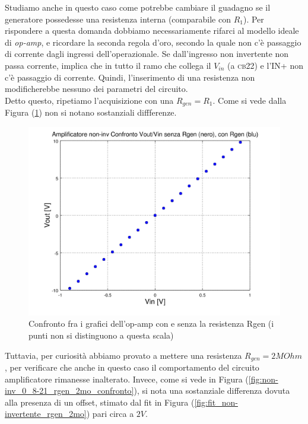 \documentclass[journal, a4paper]{IEEEtran}
\begin{document}
Studiamo anche in questo caso come potrebbe cambiare il guadagno se il generatore possedesse una resistenza interna (comparabile con $R_1$). Per rispondere a questa domanda dobbiamo necessariamente rifarci al modello ideale di \textit{op-amp}, e ricordare la seconda regola d'oro, secondo la quale non c'è passaggio di corrente dagli ingressi dell'operazionale. Se dall'ingresso non invertente non passa corrente, implica che in tutto il ramo che collega il $V_{in}$ (a \textsc{cb22}) e l'\textsc{IN+} non c'è passaggio di corrente. Quindi, l'inserimento di una resistenza non modificherebbe nessuno dei parametri del circuito.\\

Detto questo, ripetiamo l'acquisizione con una $R_{gen} = R_1 $. Come si vede dalla Figura (\ref{fig:non-inv-confronto-senza_con_rgen-0_9_21}) non si notano sostanziali diffferenze.\\

\begin{figure}
\centering
\includegraphics[width=0.9\linewidth]{./non-inv-confronto-senza_con_rgen-0_9_21}
\caption{Confronto fra i grafici dell'op-amp con e senza la resistenza Rgen (i punti non si distinguono a questa scala)}
\label{fig:non-inv-confronto-senza_con_rgen-0_9_21}
\end{figure}


Tuttavia, per curiosità abbiamo provato a mettere una resistenza $R_{gen} = 2M\si{Ohm} $, per verificare che anche in questo caso il comportamento del circuito amplificatore rimanesse inalterato. Invece, come si vede in Figura (\ref{fig:non-inv_0_8-21_rgen_2mo_confronto}), si nota una sostanziale differenza dovuta alla presenza di un offset, stimato dal fit in Figura (\ref{fig:fit_non-invertente_rgen_2mo}) pari circa a $2V$.\\
\end{document}
